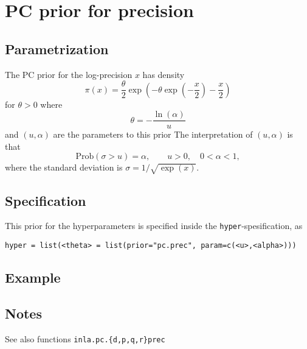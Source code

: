 \documentclass[a4paper,11pt]{article}
\begin{document}
\section*{PC prior for precision}

\subsection*{Parametrization}
The PC prior for the log-precision $x$ has density 
\begin{equation}
    \pi(x) = \frac{\theta}{2} \exp\left(
      -\theta\exp\left(-\frac{x}{2}\right) - \frac{x}{2}
    \right)
\end{equation}
for $\theta>0$ where
\begin{displaymath}
    \theta = -\frac{\ln(\alpha)}{u}
\end{displaymath}
and $(u, \alpha{})$ are the parameters to this prior The
interpretation of $(u,\alpha)$ is that
\begin{displaymath}
    \text{Prob}(\sigma > u) = \alpha, \qquad u>0, \quad 0<\alpha<1,
\end{displaymath}
where the standard deviation is $\sigma = 1/\sqrt{\exp(x)}$.

\subsection*{Specification}
This prior for the hyperparameters is specified inside the
\texttt{hyper}-spesification, as
\begin{center}
    \texttt{hyper = list(<theta> =
        list(prior="pc.prec", param=c(<u>,<alpha>)))}
\end{center}

\subsection*{Example}

\subsection*{Notes}

See also functions \texttt{inla.pc.\{d,p,q,r\}prec}
\end{document}
